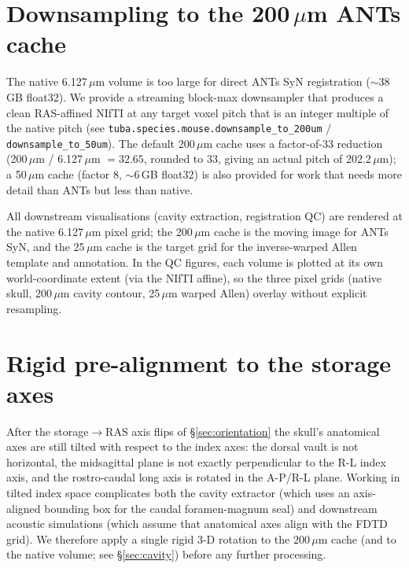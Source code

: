 \documentclass{compactarticle}
\begin{document}
\section{Downsampling to the 200\,$\mu$m ANTs cache}
\label{sec:downsample}

The native 6.127\,$\mu$m volume is too large for direct ANTs SyN
registration ($\sim$38\,GB float32). We provide a streaming
block-max downsampler that produces a clean RAS-affined NIfTI at any
target voxel pitch that is an integer multiple of the native pitch
(see \texttt{tuba.species.mouse.\allowbreak downsample\_to\_200um} /
\texttt{downsample\_to\_50um}). The default 200\,$\mu$m
cache uses a factor-of-33 reduction (200\,$\mu$m / 6.127\,$\mu$m $=
32.65$, rounded to 33, giving an actual pitch of 202.2\,$\mu$m); a
50\,$\mu$m cache (factor 8, $\sim$6\,GB float32) is also provided for
work that needs more detail than ANTs but less than native.

All downstream visualisations (cavity extraction, registration QC) are
rendered at the native 6.127\,$\mu$m pixel grid; the 200\,$\mu$m cache
is the moving image for ANTs SyN, and the 25\,$\mu$m cache is the
target grid for the inverse-warped Allen template and annotation. In
the QC figures, each volume is plotted at its own world-coordinate
extent (via the NIfTI affine), so the three pixel grids (native skull,
200\,$\mu$m cavity contour, 25\,$\mu$m warped Allen) overlay without
explicit resampling.

\section{Rigid pre-alignment to the storage axes}
\label{sec:align}

After the storage$\to$RAS axis flips of \S\ref{sec:orientation} the skull's
anatomical axes are still tilted with respect to the index axes: the
dorsal vault is not horizontal, the midsagittal plane is not exactly
perpendicular to the R-L index axis, and the rostro-caudal long axis is
rotated in the A-P/R-L plane. Working in tilted index space complicates
both the cavity extractor (which uses an axis-aligned bounding box for
the caudal foramen-magnum seal) and downstream acoustic simulations
(which assume that anatomical axes align with the FDTD grid). We
therefore apply a single rigid 3-D rotation to the 200\,$\mu$m cache
(and to the native volume; see \S\ref{sec:cavity}) before any further
processing.
\end{document}
